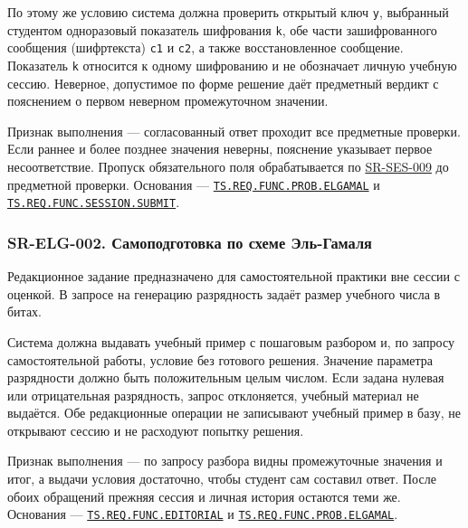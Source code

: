 \documentclass[12pt,a4paper]{article}
\begin{document}
По этому же условию система должна проверить открытый ключ \texttt{y}, выбранный студентом одноразовый показатель шифрования \texttt{k}, обе части зашифрованного сообщения (шифртекста) \texttt{c1} и \texttt{c2}, а также восстановленное сообщение. Показатель \texttt{k} относится к одному шифрованию и не обозначает личную учебную сессию. Неверное, допустимое по форме решение даёт предметный вердикт с пояснением о первом неверном промежуточном значении.

Признак выполнения --- согласованный ответ проходит все предметные проверки. Если раннее и более позднее значения неверны, пояснение указывает первое несоответствие. Пропуск обязательного поля обрабатывается по {\hyperlink{sr-ses-009}{SR-SES-009}} до предметной проверки. Основания --- {\href{../02\_Техническое\_задание/Техническое\_задание.pdf\#ts-req-func-prob-elgamal}{\texttt{TS.\allowbreak{}REQ.\allowbreak{}FUNC.\allowbreak{}PROB.\allowbreak{}ELGAMAL}}} и {\href{../02\_Техническое\_задание/Техническое\_задание.pdf\#ts-req-func-session-submit}{\texttt{TS.\allowbreak{}REQ.\allowbreak{}FUNC.\allowbreak{}SESSION.\allowbreak{}SUBMIT}}}.

\subsubsection{SR-ELG-002. Самоподготовка по схеме Эль-Гамаля}\label{sr-elg-002-ux441ux430ux43cux43eux43fux43eux434ux433ux43eux442ux43eux432ux43aux430-ux43fux43e-ux441ux445ux435ux43cux435-ux44dux43bux44c-ux433ux430ux43cux430ux43bux44f}

\hypertarget{sr-elg-002-самоподготовка-по-схеме-эль-гамаля}{}

\hypertarget{sr-elg-002}{}

Редакционное задание предназначено для самостоятельной практики вне сессии с оценкой. В запросе на генерацию разрядность задаёт размер учебного числа в битах.

Система должна выдавать учебный пример с пошаговым разбором и, по запросу самостоятельной работы, условие без готового решения. Значение параметра разрядности должно быть положительным целым числом. Если задана нулевая или отрицательная разрядность, запрос отклоняется, учебный материал не выдаётся. Обе редакционные операции не записывают учебный пример в базу, не открывают сессию и не расходуют попытку решения.

Признак выполнения --- по запросу разбора видны промежуточные значения и итог, а выдачи условия достаточно, чтобы студент сам составил ответ. После обоих обращений прежняя сессия и личная история остаются теми же. Основания --- {\href{../02\_Техническое\_задание/Техническое\_задание.pdf\#ts-req-func-editorial}{\texttt{TS.\allowbreak{}REQ.\allowbreak{}FUNC.\allowbreak{}EDITORIAL}}} и {\href{../02\_Техническое\_задание/Техническое\_задание.pdf\#ts-req-func-prob-elgamal}{\texttt{TS.\allowbreak{}REQ.\allowbreak{}FUNC.\allowbreak{}PROB.\allowbreak{}ELGAMAL}}}.
\end{document}
